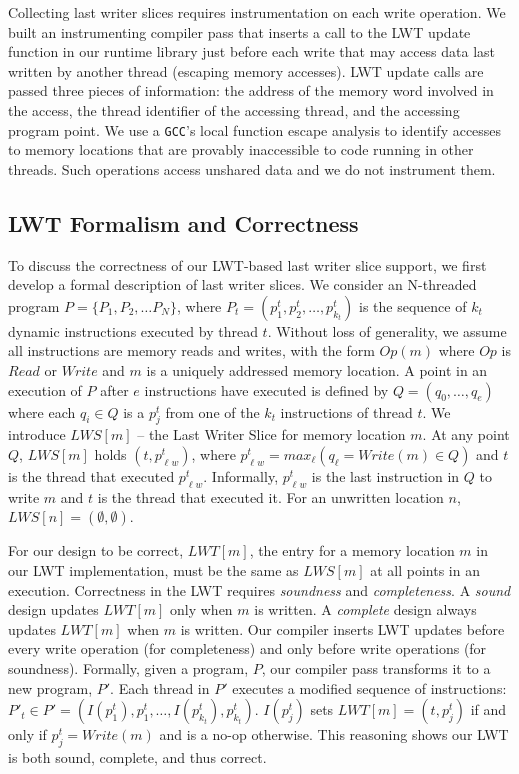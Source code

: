 \documentclass[preprint,9pt]{sigplanconf}
\newcommand{\lwt}{LWT\xspace}
\begin{document}
Collecting last writer slices requires instrumentation on each write operation.
We built an instrumenting compiler pass that inserts a call to the \lwt update
function in our runtime library just before each write that may access data
last written by another thread (escaping memory accesses).  \lwt update 
calls are passed three pieces of information: the address of
the memory word involved in the access, the thread identifier of the accessing
thread, and the accessing program point.   We use a {\tt GCC}'s local function
escape analysis to identify accesses to memory locations that are provably
inaccessible to code running in other threads.  Such operations access unshared
data and we do not instrument them.  



\subsection{\lwt Formalism and Correctness}
\label{sec:lwssoundness}
To discuss the correctness of our \lwt-based last writer slice support, we
first develop a formal description of last writer slices.  We consider an
N-threaded program $P = \{P_1, P_2, \ldots P_N\}$, where $P_t = (p^{t}_{1},
p^{t}_{2}, \ldots, p^{t}_{k_{t}})$ is the sequence of $k_{t}$ dynamic
instructions executed by thread $t$.  Without loss of generality, we assume all
instructions are memory reads and writes, with the form $Op(m)$ where $Op$ is
$Read$ or $Write$ and $m$ is a uniquely addressed memory location.
A point in an execution of $P$ after $e$ instructions have
executed is defined by $Q = (q_{0}, \ldots, q_{e})$ where each $q_{i} \in Q$ is a
$p^{t}_{j}$ from one of the $k_t$ instructions of thread $t$.  We introduce
$LWS[m]$ -- the Last Writer Slice for memory location $m$.   At any point $Q$,
$LWS[m]$ holds $(t,p^{t}_{\ell w})$, where $p^{t}_{\ell w} = max_{\ell}( 
q_{\ell} = Write(m) \in Q)$ and $t$ is the thread that
executed $p^{t}_{\ell w}$. Informally, $p^{t}_{\ell w}$ is the last instruction
in $Q$ to write $m$ and $t$ is the thread that executed it.  For an
unwritten location $n$, $LWS[n] = (\emptyset,\emptyset)$.

For our design to be correct, $LWT[m]$, the entry for a memory location $m$ in
our \lwt implementation, must be the same as $LWS[m]$ at all points in an
execution.  Correctness in the \lwt requires {\em soundness} and {\em
completeness}.  A {\em sound} design updates $LWT[m]$ only when $m$ is written.
A {\em complete} design always updates $LWT[m]$ when $m$ is written.  Our
compiler inserts \lwt updates before every write operation (for completeness)
and only before write operations (for soundness).  Formally, given a program,
$P$, our compiler pass transforms it to a new program, $P'$.  Each thread in
$P'$ executes a modified sequence of instructions: $P'_{t} \in P' = ( 
I(p^{t}_{1}), p^{t}_{1}, \ldots, I(p^{t}_{k_{t}}), p^{t}_{k_{t}} )$.
$I(p^{t}_{j})$ sets $LWT[m] = (t,p^{t}_{j})$ if and only if $p^{t}_{j} =
Write(m)$ and is a no-op otherwise.  This reasoning shows our \lwt is both
sound, complete, and thus correct.
\end{document}
